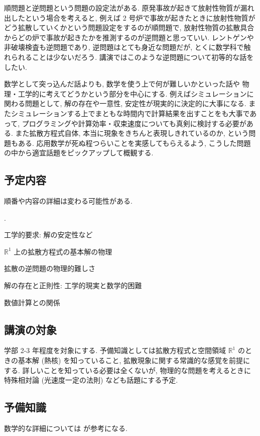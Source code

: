 \documentclass[openany, a4paper, oneside]{book}
\newcounter{enum2}
\renewenvironment{enumerate}{%
\begin{list}%
{%
\arabic{enum2}.\ \,%
}%
{%
\usecounter{enum2}
\setlength{\itemindent}{0pt}%
\setlength{\leftmargin}{6pt}%
\setlength{\rightmargin}{0pt}%
\setlength{\labelsep}{0pt}%
\setlength{\labelwidth}{6pt}%
\setlength{\itemsep}{0pt}%
\setlength{\parsep}{0pt}%
\setlength{\listparindent}{0pt}%
}
}{%
\end{list}%
}
\theoremstyle{break}
\theoremstyle{breakdefn}
\begin{document}
順問題と逆問題という問題の設定法がある.
原発事故が起きて放射性物質が漏れ出したという場合を考えると,
例えば 2 号炉で事故が起きたときに放射性物質がどう拡散していくかという問題設定をするのが順問題で,
放射性物質の拡散具合からどの炉で事故が起きたかを推測するのが逆問題と思っていい.
レントゲンや非破壊検査も逆問題であり, 逆問題はとても身近な問題だが,
とくに数学科で触れられることは少ないだろう.
講演ではこのような逆問題について初等的な話をしたい.

数学として突っ込んだ話よりも, 数学を使う上で何が難しいかといった話や
物理・工学的に考えてどうかという部分を中心にする.
例えばシミュレーションに関わる問題として, 解の存在や一意性, 安定性が現実的に決定的に大事になる.
またシミュレーションする上でまともな時間内で計算結果を出すことをも大事であって,
プログラミングや計算効率・収束速度についても真剣に検討する必要がある.
また拡散方程式自体, 本当に現象をきちんと表現しきれているのか, という問題もある.
応用数学が死ぬ程つらいことを実感してもらえるよう,
こうした問題の中から適宜話題をピックアップして概観する.
\subsection{予定内容}
\label{sec-7-9-2-2}

順番や内容の詳細は変わる可能性がある.
\begin{enumerate}
\item 工学的要求: 解の安定性など
\item $\mathbb{R}^1$ 上の拡散方程式の基本解の物理
\item 拡散の逆問題の物理的難しさ
\item 解の存在と正則性: 工学的現実と数学的困難
\item 数値計算との関係
\end{enumerate}
\subsection{講演の対象}
\label{sec-7-9-2-3}

学部 2-3 年程度を対象にする.
予備知識としては拡散方程式と空間領域 $\mathbb{R}^1$ のときの基本解 (熱核) を知っていること,
拡散現象に関する常識的な感覚を前提にする.
詳しいことを知っている必要は全くないが,
物理的な問題を考えるときに特殊相対論 (光速度一定の法則) なども話題にする予定.
\subsection{予備知識}
\label{sec-7-9-2-4}

数学的な詳細については \cite{Kotorin1, KimYamamoto1, NoborizakaOnishiYamamoto1} が参考になる.
\end{document}
